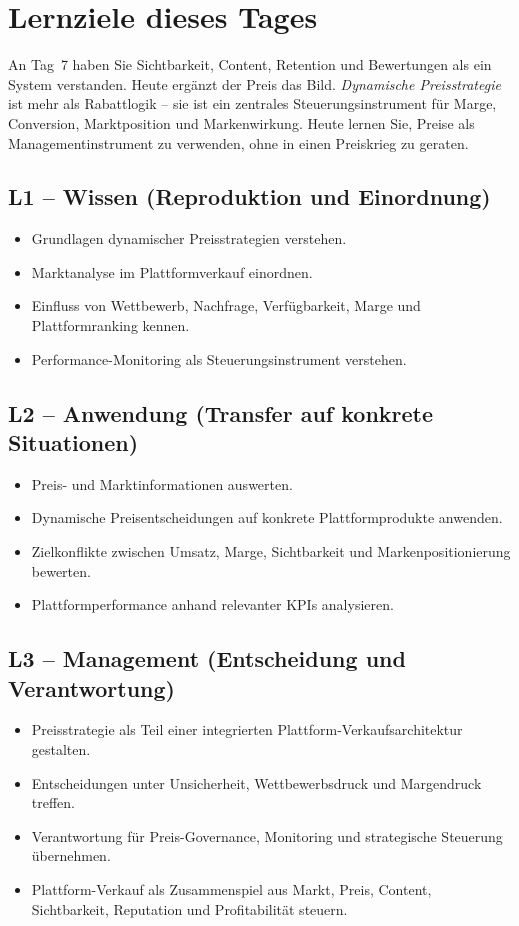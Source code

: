 \documentclass[11pt,a4paper,oneside]{article}
\begin{document}
\section*{Lernziele dieses Tages}
\thispagestyle{plain}

\noindent An Tag~7 haben Sie Sichtbarkeit, Content, Retention und Bewertungen als ein System verstanden. Heute ergänzt der Preis das Bild. \emph{Dynamische Preisstrategie} ist mehr als Rabattlogik -- sie ist ein zentrales Steuerungsinstrument für Marge, Conversion, Marktposition und Markenwirkung. Heute lernen Sie, Preise als Managementinstrument zu verwenden, ohne in einen Preiskrieg zu geraten.

\subsection*{L1 -- Wissen (Reproduktion und Einordnung)}
\begin{itemize}
  \item Grundlagen dynamischer Preisstrategien verstehen.
  \item Marktanalyse im Plattformverkauf einordnen.
  \item Einfluss von Wettbewerb, Nachfrage, Verfügbarkeit, Marge und Plattformranking kennen.
  \item Performance-Monitoring als Steuerungsinstrument verstehen.
\end{itemize}

\subsection*{L2 -- Anwendung (Transfer auf konkrete Situationen)}
\begin{itemize}
  \item Preis- und Marktinformationen auswerten.
  \item Dynamische Preisentscheidungen auf konkrete Plattformprodukte anwenden.
  \item Zielkonflikte zwischen Umsatz, Marge, Sichtbarkeit und Markenpositionierung bewerten.
  \item Plattformperformance anhand relevanter KPIs analysieren.
\end{itemize}

\subsection*{L3 -- Management (Entscheidung und Verantwortung)}
\begin{itemize}
  \item Preisstrategie als Teil einer integrierten Plattform-Verkaufsarchitektur gestalten.
  \item Entscheidungen unter Unsicherheit, Wettbewerbsdruck und Margendruck treffen.
  \item Verantwortung für Preis-Governance, Monitoring und strategische Steuerung übernehmen.
  \item Plattform-Verkauf als Zusammenspiel aus Markt, Preis, Content, Sichtbarkeit, Reputation und Profitabilität steuern.
\end{itemize}
\end{document}
